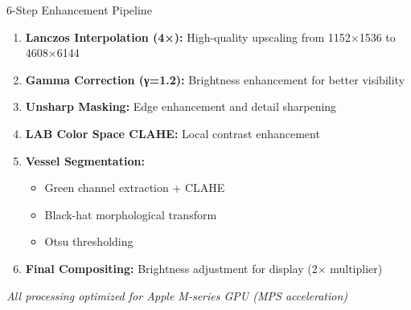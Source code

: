 \documentclass[aspectratio=169]{beamer}
\begin{document}
\begin{frame}{6-Step Enhancement Pipeline}
\begin{enumerate}
    \item \textbf{Lanczos Interpolation (4×):} High-quality upscaling from 1152×1536 to 4608×6144

    \item \textbf{Gamma Correction (γ=1.2):} Brightness enhancement for better visibility

    \item \textbf{Unsharp Masking:} Edge enhancement and detail sharpening

    \item \textbf{LAB Color Space CLAHE:} Local contrast enhancement

    \item \textbf{Vessel Segmentation:}
    \begin{itemize}
        \item Green channel extraction + CLAHE
        \item Black-hat morphological transform
        \item Otsu thresholding
    \end{itemize}

    \item \textbf{Final Compositing:} Brightness adjustment for display (2× multiplier)
\end{enumerate}

\vspace{0.3cm}
\centering
\textit{All processing optimized for Apple M-series GPU (MPS acceleration)}
\end{frame}
\end{document}
